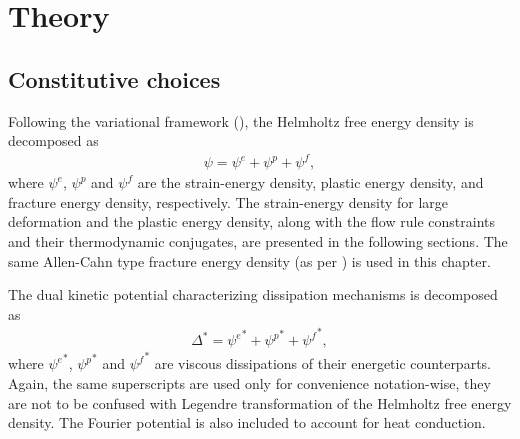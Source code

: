 \section{Theory}
\label{section: chapter5/theory}

\subsection{Constitutive choices}

Following the variational framework (), the Helmholtz free energy density is decomposed as
\begin{align}
  \psi = \psi^e + \psi^p + \psi^f, \label{eq: chapter 5 helmholtz}
\end{align}
where $\psi^e$, $\psi^p$ and $\psi^f$ are the strain-energy density, plastic energy density, and fracture energy density, respectively. The strain-energy density for large deformation and the plastic energy density, along with the flow rule constraints and their thermodynamic conjugates, are presented in the following sections. The same Allen-Cahn type fracture energy density (as per ) is used in this chapter.

The dual kinetic potential characterizing dissipation mechanisms is decomposed as
\begin{align}
  \Delta^* = {\psi^e}^* + {\psi^p}^* + {\psi^f}^*, \label{eq: chapter 5 dual kinetic potential}
\end{align}
where ${\psi^e}^*$, ${\psi^p}^*$ and ${\psi^f}^*$ are viscous dissipations of their energetic counterparts. Again, the same superscripts are used only for convenience notation-wise, they are not to be confused with Legendre transformation of the Helmholtz free energy density. The Fourier potential is also included to account for heat conduction.

